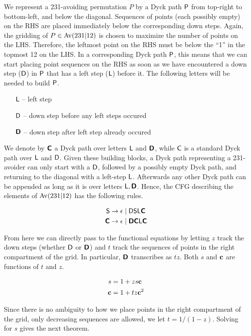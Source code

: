 \documentclass[12pt, a4paper, twoside]{report}
\begin{document}
We represent a 231-avoiding permutation $P$ by a Dyck path $\textsf{P}$ from top-right to bottom-left, and below the diagonal. Sequences of points (each possibly empty) on the RHS are placed immediately below the corresponding down steps. Again, the gridding of $P \in \mathrm{Av}(231|12)$ is chosen to maximize the number of points on the LHS. Therefore, the leftmost point on the RHS must be below the ``1'' in the topmost 12 on the LHS. In a corresponding Dyck path $\textsf{P}$, this means that we can start placing point sequences on the RHS as soon as we have encountered a down step ($\mathsf{D}$) in $\textsf{P}$ that has a left step ($\mathsf{L}$) before it. The following letters will be needed to build $\textsf{P}$. 
\begin{enumerate}
\item[$\mathsf{L}$ --] left step
\item[$\mathsf{D}$ --] down step before any left steps occured
\item[$\textbf{\textsf{D}}$ --] down step after left step already occured
\end{enumerate}

We denote by $\textbf{\textsf{C}}$ a Dyck path over letters $\mathsf{L}$ and $\textbf{\textsf{D}}$, while $\mathsf{C}$ is a standard Dyck path over $\mathsf{L}$ and $\mathsf{D}$. Given these building blocks, a Dyck path representing a 231-avoider can only start with a $\mathsf{D}$, followed by a possibly empty Dyck path, and returning to the diagonal with a left-step $\mathsf{L}$. Afterwards any other Dyck path can be appended as long as it is over letters $\mathsf{L}, \textbf{\textsf{D}}$. Hence, the CFG describing the elements of $\mathrm{Av}(231|12)$ has the following rules.

\begin{align*}
\mathsf{S} &\to \epsilon \mid \mathsf{D}\mathsf{S}\mathsf{L}\textbf{\textsf{C}}\\
\textbf{\textsf{C}} &\to \epsilon \mid \textbf{\textsf{D}}\textbf{\textsf{C}}\mathsf{L}\textbf{\textsf{C}}
\end{align*}

From here we can directly pass to the functional equations by letting $z$ track the down steps (whether $\mathsf{D}$ or $\textbf{\textsf{D}}$) and $t$ track the sequences of points in the right compartment of the grid. In particular, $\textbf{\textsf{D}}$ transcribes as $tz$. Both $s$ and $\mathbf{c}$ are functions of $t$ and $z$.

\begin{align*}
s &= 1 + zs\mathbf{c}\\
\mathbf{c} &= 1 + tz\mathbf{c}^2
\end{align*}

Since there is no ambiguity to how we place points in the right compartment of the grid, only decreasing sequences are allowed, we let $t = 1/(1-z)$. Solving for $s$ gives the next theorem. 
\end{document}
